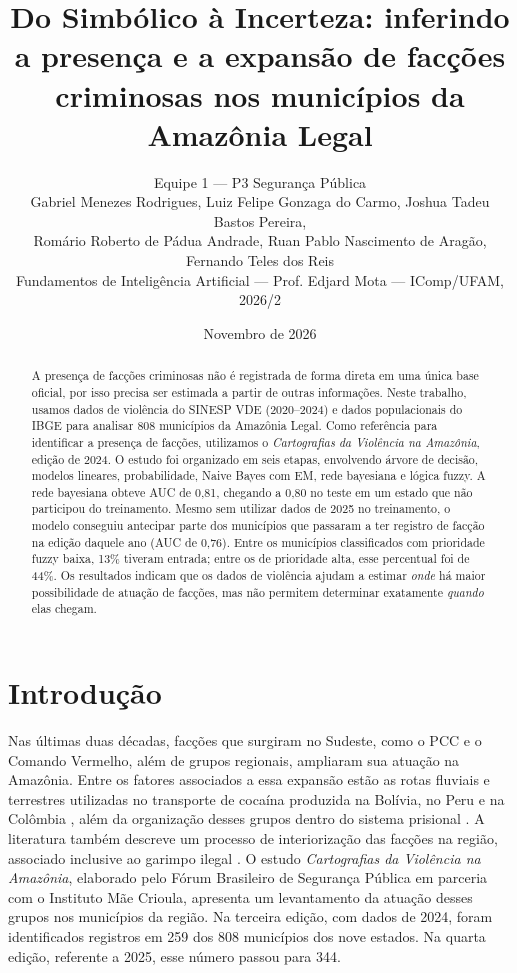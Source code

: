 \documentclass[10pt,a4paper,twocolumn]{article}
\title{\textbf{Do Simbólico à Incerteza: inferindo a presença e a expansão de facções criminosas nos municípios da Amazônia Legal}}
\author{\normalsize Equipe 1 --- P3 Segurança Pública\\[3pt]
\small Gabriel Menezes Rodrigues, Luiz Felipe Gonzaga do Carmo, Joshua Tadeu Bastos Pereira,\\
\small Romário Roberto de Pádua Andrade, Ruan Pablo Nascimento de Aragão, Fernando Teles dos Reis\\[3pt]
\small Fundamentos de Inteligência Artificial --- Prof. Edjard Mota --- IComp/UFAM, 2026/2}
\date{Novembro de 2026}
\begin{document}
\maketitle

\begin{abstract}
A presença de facções criminosas não é registrada de forma direta em uma única base oficial, por isso precisa ser estimada a partir de outras informações. Neste trabalho, usamos dados de violência do SINESP VDE (2020--2024) e dados populacionais do IBGE para analisar 808 municípios da Amazônia Legal. Como referência para identificar a presença de facções, utilizamos o \emph{Cartografias da Violência na Amazônia}, edição de 2024. O estudo foi organizado em seis etapas, envolvendo árvore de decisão, modelos lineares, probabilidade, Naive Bayes com EM, rede bayesiana e lógica fuzzy. A rede bayesiana obteve AUC de 0,81, chegando a 0,80 no teste em um estado que não participou do treinamento. Mesmo sem utilizar dados de 2025 no treinamento, o modelo conseguiu antecipar parte dos municípios que passaram a ter registro de facção na edição daquele ano (AUC de 0,76). Entre os municípios classificados com prioridade fuzzy baixa, 13\% tiveram entrada; entre os de prioridade alta, esse percentual foi de 44\%. Os resultados indicam que os dados de violência ajudam a estimar \emph{onde} há maior possibilidade de atuação de facções, mas não permitem determinar exatamente \emph{quando} elas chegam.
\end{abstract}

\section{Introdução}
Nas últimas duas décadas, facções que surgiram no Sudeste, como o PCC e o Comando Vermelho, além de grupos regionais, ampliaram sua atuação na Amazônia. Entre os fatores associados a essa expansão estão as rotas fluviais e terrestres utilizadas no transporte de cocaína produzida na Bolívia, no Peru e na Colômbia \cite{couto2020}, além da organização desses grupos dentro do sistema prisional \cite{siq}. A literatura também descreve um processo de interiorização das facções na região, associado inclusive ao garimpo ilegal \cite{couto2024,chagas2024}. O estudo \emph{Cartografias da Violência na Amazônia}, elaborado pelo Fórum Brasileiro de Segurança Pública em parceria com o Instituto Mãe Crioula, apresenta um levantamento da atuação desses grupos nos municípios da região. Na terceira edição, com dados de 2024, foram identificados registros em 259 dos 808 municípios dos nove estados. Na quarta edição, referente a 2025, esse número passou para 344.
\end{document}
